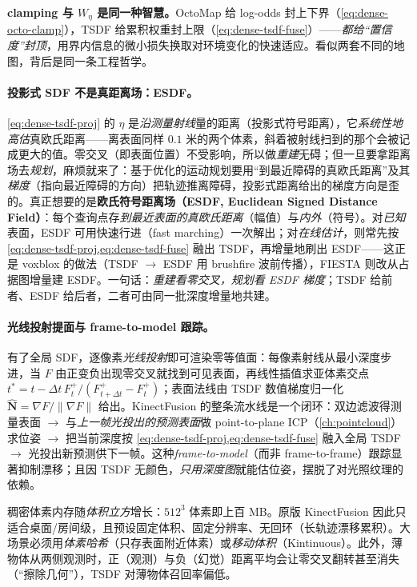 \begin{insight}
\textbf{clamping 与 $W_\eta$ 是同一种智慧。}OctoMap 给 log-odds 封上下界（\cref{eq:dense-octo-clamp}），TSDF 给累积权重封上限（\cref{eq:dense-tsdf-fuse}）——\emph{都给“置信度”封顶}，用界内信息的微小损失换取对环境变化的快速适应。看似两套不同的地图，背后是同一条工程哲学。
\end{insight}

\paragraph{投影式 SDF 不是真距离场：ESDF。}
\cref{eq:dense-tsdf-proj} 的 $\eta$ 是\emph{沿测量射线}量的距离（投影式符号距离），它\emph{系统性地高估}真欧氏距离——离表面同样 $0.1$ 米的两个体素，斜着被射线扫到的那个会被记成更大的值。零交叉（即表面位置）不受影响，所以做\emph{重建}无碍；但一旦要拿距离场去\emph{规划}，麻烦就来了：基于优化的运动规划要用“到最近障碍的真欧氏距离”及其\emph{梯度}（指向最近障碍的方向）把轨迹推离障碍，投影式距离给出的梯度方向是歪的。真正想要的是\textbf{欧氏符号距离场（ESDF, Euclidean Signed Distance Field）}：每个查询点存\emph{到最近表面的真欧氏距离}（幅值）与\emph{内外}（符号）。对\emph{已知}表面，ESDF 可用快速行进（fast marching）一次解出；对\emph{在线估计}，则常先按 \cref{eq:dense-tsdf-proj,eq:dense-tsdf-fuse} 融出 TSDF，再增量地刷出 ESDF——这正是 voxblox\cite{oleynikova2017voxblox} 的做法（TSDF $\to$ ESDF 用 brushfire 波前传播），FIESTA\cite{han2019fiesta} 则改从占据图增量建 ESDF。一句话：\emph{重建看零交叉，规划看 ESDF 梯度}；TSDF 给前者、ESDF 给后者，二者可由同一批深度增量地共建。

\paragraph{光线投射提面与 frame-to-model 跟踪。}
有了全局 SDF，逐像素\emph{光线投射}即可渲染零等值面：每像素射线从最小深度步进，当 $F$ 由正变负出现零交叉就找到可见表面，再线性插值求亚体素交点 $t^*=t-\Delta t\,F_t^+/(F_{t+\Delta t}^+-F_t^+)$；表面法线由 TSDF 数值梯度归一化 $\hat{\mathbf{N}}=\nabla F/\|\nabla F\|$ 给出。KinectFusion 的整条流水线是一个闭环：双边滤波得测量表面 $\to$ 与\emph{上一帧光投出的预测表面}做 point-to-plane ICP（\cref{ch:pointcloud}）求位姿 $\to$ 把当前深度按 \cref{eq:dense-tsdf-proj,eq:dense-tsdf-fuse} 融入全局 TSDF $\to$ 光投出新预测供下一帧。这种\emph{frame-to-model}（而非 frame-to-frame）跟踪显著抑制漂移；且因 TSDF 无颜色，\emph{只用深度图}就能估位姿，摆脱了对光照纹理的依赖。

\begin{pitfall}
稠密体素内存随\emph{体积立方}增长：$512^3$ 体素即上百 MB。原版 KinectFusion 因此只适合桌面/房间级，且预设固定体积、固定分辨率、无回环（长轨迹漂移累积）。大场景必须用\emph{体素哈希}（只存表面附近体素）或\emph{移动体积}（Kintinuous）。此外，薄物体从两侧观测时，正（观测）与负（幻觉）距离平均会让零交叉翻转甚至消失（“擦除几何”），TSDF 对薄物体召回率偏低。
\end{pitfall}


